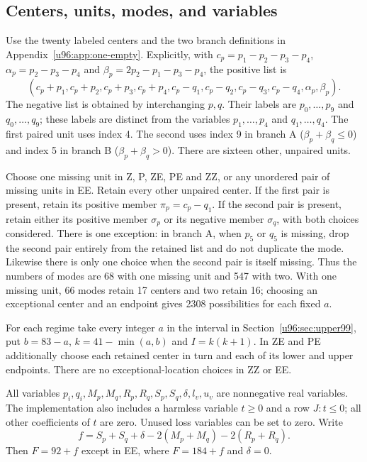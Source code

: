 \documentclass[11pt,a4paper]{article}
\theoremstyle{remark}
\begin{document}
\subsection{Centers, units, modes, and variables}
Use the twenty labeled centers and the two branch definitions in
Appendix~\ref{u96:app:one-empty}. Explicitly, with
$c_p=p_1-p_2-p_3-p_4$,
$\alpha_p=p_2-p_3-p_4$ and
$\beta_p=2p_2-p_1-p_3-p_4$, the positive list is
\[
 (c_p+p_1,c_p+p_2,c_p+p_3,c_p+p_4,
 c_p-q_1,c_p-q_2,c_p-q_3,c_p-q_4,\alpha_p,\beta_p).
\]
The negative list is obtained by interchanging $p,q$. Their labels are
$p_0,\ldots,p_9$ and $q_0,\ldots,q_9$; these labels are distinct from
the variables $p_1,\ldots,p_4$ and $q_1,\ldots,q_4$.
The first paired unit uses index 4. The second uses index 9 in branch A
($\beta_p+\beta_q\leq0$) and index 5 in branch B
($\beta_p+\beta_q>0$). There are sixteen other, unpaired units.

Choose one missing unit in Z, P, ZE, PE and ZZ, or any unordered pair of
missing units in EE. Retain every other unpaired center. If the first
pair is present, retain its positive member $\pi_p=c_p-q_1$.
If the second pair is present, retain either its positive member
$\sigma_p$ or its negative member $\sigma_q$, with both choices considered.
There is one exception: in branch A, when $p_5$ or $q_5$ is missing,
drop the second pair entirely from the retained list and do not duplicate
the mode. Likewise there is only one choice when the second pair is
itself missing. Thus the numbers of modes are 68 with one missing unit
and 547 with two. With one missing unit, 66 modes retain 17 centers and
two retain 16; choosing an exceptional center and an endpoint gives 2308
possibilities for each fixed $a$.

For each regime take every integer $a$ in the interval in
Section~\ref{u96:sec:upper99}, put $b=83-a$, $k=41-\min(a,b)$ and $I=k(k+1)$.
In ZE and PE additionally choose each retained center in turn and each
of its lower and upper endpoints. There are no exceptional-location
choices in ZZ or EE.

All variables $p_i,q_i,M_p,M_q,R_p,R_q,S_p,S_q,\delta,l_v,u_v$ are
nonnegative real variables. The implementation also includes a harmless
variable $t\geq0$ and a row $J:t\leq0$; all other coefficients of $t$
are zero. Unused loss variables can be set to zero.
Write
\[
 f=S_p+S_q+\delta-2(M_p+M_q)-2(R_p+R_q).
\]
Then $F=92+f$ except in EE, where $F=184+f$ and $\delta=0$.
\end{document}
